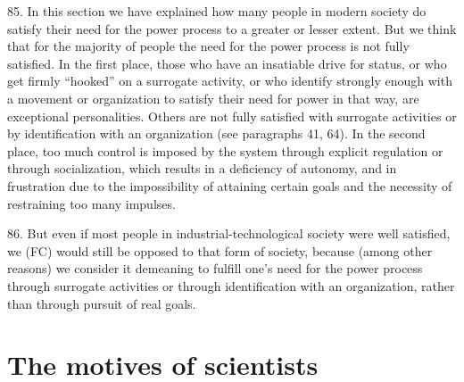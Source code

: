 \documentclass{article}
\begin{document}
85.  In this section we have explained how many people in modern society do satisfy their need 
for the power process to a greater or lesser extent.  But we think that for the majority of people the 
need for the power process is not fully satisfied.  In the first place, those who have an insatiable 
drive  for  status,  or  who  get  firmly  “hooked”  on  a  surrogate  activity,  or  who  identify  strongly  
enough  with  a  movement  or  organization  to  satisfy  their  need  for  power  in  that  way,  are  
exceptional personalities.  Others are not fully satisfied with surrogate activities or by 
identification with an organization (see paragraphs 41, 64).  In the second place, too much control 
is imposed by the system through explicit regulation or through socialization, which results in a 
deficiency of autonomy, and in frustration due to the impossibility of attaining certain goals and 
the necessity of restraining too many impulses. \vspace{\baselineskip} \newpage

86.  But even if most people in industrial-technological society were well satisfied, we (FC) would 
still be opposed to that form of society, because (among other reasons) we consider it demeaning 
to  fulfill  one’s  need  for  the  power  process  through  surrogate  activities  or  through  identification  
with an organization, rather than through pursuit of real goals. 


\section{The motives of scientists}
\end{document}
